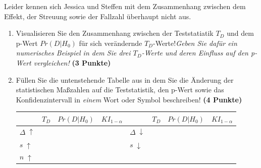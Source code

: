 \documentclass[a4paper, 9pt]{scrartcl}\usepackage[]{graphicx}\usepackage[]{xcolor}
\begin{document}
\vspace{1ex}

Leider kennen sich Jessica und Steffen mit dem Zusammenhang zwischen dem Effekt, der Streuung sowie der Fallzahl überhaupt nicht aus. 


\begin{enumerate}
\item Visualisieren Sie den Zusammenhang zwischen der Teststatiatik $T_{D}$ und dem p-Wert $Pr(D|H_0)$ für sich verändernde $T_{D}$-Werte!\textit{Geben Sie dafür ein numerisches Beispiel in dem Sie drei $T_{D}$-Werte und deren Einfluss auf den p-Wert vergleichen!} \textbf{(3 Punkte)}  
\item  Füllen Sie die untenstehende Tabelle aus in dem Sie die Änderung der statistischen Maßzahlen auf die Teststatistik, den p-Wert sowie das Konfidenzintervall in \textit{einem} Wort oder Symbol beschreiben! \textbf{(4 Punkte)}
\begin{center}
  \large
  \begin{tabular}[c]{l|c|c|c|l|c|c|c}
    & $T_{D}$ & $Pr(D|H_0)$ & $KI_{1-\alpha}$ & & $T_{D}$ & $Pr(D|H_0)$ & $KI_{1-\alpha}$\strut\\ 
    \hline
    \textbf{$\Delta\; \uparrow$} & \hspace{1.8cm} & \hspace{1.8cm}  & \hspace{1.8cm} & \textbf{
                                                          $\Delta\; \downarrow$} &
                                                                          \hspace{1.8cm} & \hspace{1.8cm}  & \hspace{1.8cm}\strut\\
    \hline
        \textbf{$s\; \uparrow$} & \hspace{1.8cm} & \hspace{1.8cm}  & \hspace{1.8cm} & \textbf{
                                                          $s\; \downarrow$} &
                                                                          \hspace{1.8cm}
                                                & \hspace{1.8cm}  & \hspace{1.8cm}\strut\\
    \hline
        \textbf{$n\; \uparrow$} & \hspace{1.8cm} & \hspace{1.8cm}  & \hspace{1.8cm} & \textbf{
}
\end{tabular}
\end{center}
\end{enumerate}
\end{document}
